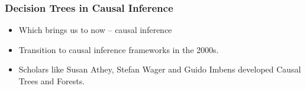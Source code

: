 \documentclass{beamer}
\begin{document}
\begin{frame}
\frametitle{Decision Trees in Causal Inference}
\begin{itemize}
	\item Which brings us to now -- causal inference
    \item Transition to causal inference frameworks in the 2000s.
    \item Scholars like Susan Athey, Stefan Wager and Guido Imbens developed Causal Trees and Forests.
\end{itemize}
\end{frame}
\end{document}
